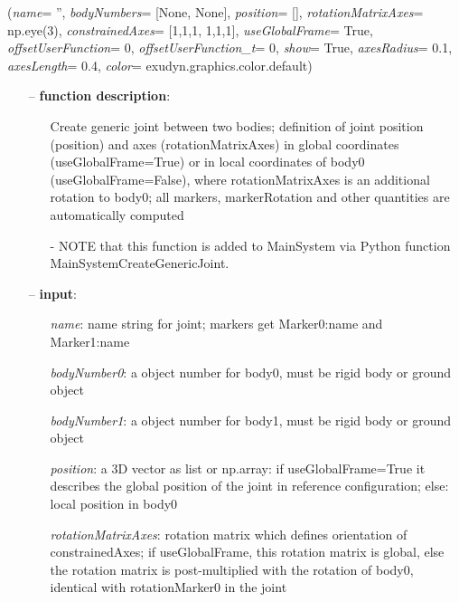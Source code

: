 %
\begin{flushleft}
\label{sec:mainsystemextensions:CreateGenericJoint}
({\it name}= '', {\it bodyNumbers}= [None, None], {\it position}= [], {\it rotationMatrixAxes}= np.eye(3), {\it constrainedAxes}= [1,1,1, 1,1,1], {\it useGlobalFrame}= True, {\it offsetUserFunction}= 0, {\it offsetUserFunction\_t}= 0, {\it show}= True, {\it axesRadius}= 0.1, {\it axesLength}= 0.4, {\it color}= exudyn.graphics.color.default)
\end{flushleft}
\setlength{\itemindent}{0.7cm}
\begin{itemize}[leftmargin=0.7cm]
\item[--]
{\bf function description}: \vspace{-6pt}
\begin{itemize}[leftmargin=1.2cm]
\setlength{\itemindent}{-0.7cm}
\item[]Create generic joint between two bodies; definition of joint position (position) and axes (rotationMatrixAxes) in global coordinates (useGlobalFrame=True) or in local coordinates of body0 (useGlobalFrame=False), where rotationMatrixAxes is an additional rotation to body0; all markers, markerRotation and other quantities are automatically computed
\item[]- NOTE that this function is added to MainSystem via Python function MainSystemCreateGenericJoint.
\end{itemize}
\item[--]
{\bf input}: \vspace{-6pt}
\begin{itemize}[leftmargin=1.2cm]
\setlength{\itemindent}{-0.7cm}
\item[]{\it name}: name string for joint; markers get Marker0:name and Marker1:name
\item[]{\it bodyNumber0}: a object number for body0, must be rigid body or ground object
\item[]{\it bodyNumber1}: a object number for body1, must be rigid body or ground object
\item[]{\it position}: a 3D vector as list or np.array: if useGlobalFrame=True it describes the global position of the joint in reference configuration; else: local position in body0
\item[]{\it rotationMatrixAxes}: rotation matrix which defines orientation of constrainedAxes; if useGlobalFrame, this rotation matrix is global, else the rotation matrix is post-multiplied with the rotation of body0, identical with rotationMarker0 in the joint

\end{itemize}
\end{itemize}
